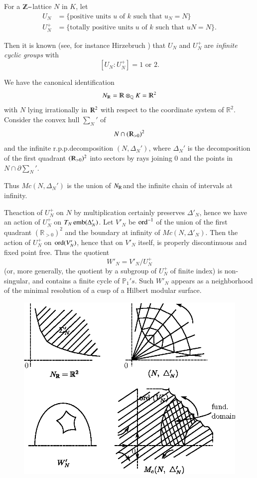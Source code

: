   \begin{defi*}
 For a $\varmathbb{Z}-$lattice $N$ in $K$, let  
  \begin{align*}
U_N &= \{ \text{positive units $u$ of $k$ such that } u_N=N\}\\ 
U_N^+ &= \{\text{totally positive units $u$ of $k$ such that } uN=N\}.
 \end{align*} 
  \end{defi*}  

  Then it is known (see, for instance Hirzebruch \cite{keyH4}) that  $U_N$
  and $U_N^+$ are \textit{infinite cyclic groups} with  
    $$
  [U_N  : U_N^+] = 1 \text{ or }   2.
  $$

  We have the canonical identification
    $$
  N_{\varmathbb{R}}=  \varmathbb{R} \otimes_{\mathbb{Q}} K = \varmathbb{R}^2
   $$
    with $N$ lying irrationally in $\varmathbb{R}^2$ with respect to
    the coordinate system of $\mathbb{R}^2$. Consider the convex hull
    $\sum_N '$  of  
    $$
 N \cap (\varmathbb{R}_{>0})^2  
  $$
    and the infinite r.p.p.decomposition $(N, \Delta_N ')$, where
  $\Delta_N'$ is the decomposition of the first quadrant $(
  \varmathbb{R}_{>0})^2$ into sectors by rays joining 0 and the
  points in $N \cap \partial \sum_N '$. 
  
  Thus $ Mc(N, \Delta_N ')$  is the union of $N_{\varmathbb{R}} $and
  the infinite chain of intervals at infinity. 

The\pageoriginale action of $U^+_N$ on $N$ by multiplication certainly
preserves $\Delta'_N$, hence we have an action of $U^+_N$ on $T_N
\operatorname{emb}(\Delta'_N)$.  Let $V'_N$ be $\operatorname{ord}^{-1}$ of the union of the first
quadrant $(\mathbb{R}_{> 0})^2$ and the boundary at infinity of $Mc (N, 
\Delta'_N)$. Then the action of $U^+_N$ on $\operatorname{ord} (V'_N)$, hence that
on $V'_N$ itself, is properly discontinuous and fixed point free.
Thus the quotient   
$$
W'_N = V'_N/ U^+_N
$$
(or, more generally,  the quotient by a subgroup of $ U^+_N$ of finite
index) is non-singular,  and contains a finite cycle of
$\mathbb{P}_1 's$.  Such $W'_N$ appears as a neighborhood of the
minimal resolution of a cusp of a Hilbert modular surface. 
\begin{figure}[H]
\centering 
\includegraphics{vol58-fig/fig58-80.eps} 
\end{figure}

